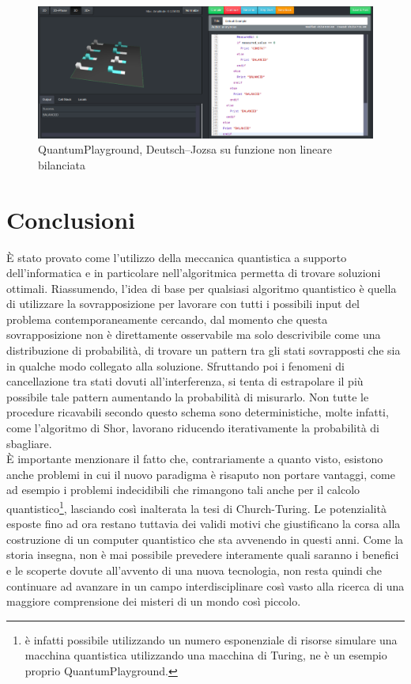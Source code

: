 \documentclass[12pt,a4paper,openright]{report}
\begin{document}
\begin{figure}[h]
    
            \includegraphics[width=.92\textwidth,height=\textheight,keepaspectratio]{nonLinearBalancedFunction}
            \caption{QuantumPlayground, Deutsch–Jozsa su funzione non lineare bilanciata}
        
\end{figure}

\chapter{Conclusioni}
È stato provato come l'utilizzo della meccanica quantistica a supporto dell'informatica e in particolare nell'algoritmica permetta di trovare soluzioni ottimali.
Riassumendo, l'idea di base per qualsiasi algoritmo quantistico è quella di utilizzare la sovrapposizione per lavorare con tutti i possibili input
del problema contemporaneamente cercando, dal momento che questa sovrapposizione non è direttamente osservabile ma solo descrivibile come una distribuzione di 
probabilità, di trovare un pattern tra gli stati sovrapposti che sia in qualche modo collegato alla soluzione. Sfruttando poi i fenomeni di cancellazione tra stati
dovuti all'interferenza, si tenta di estrapolare il più possibile tale pattern aumentando la probabilità di misurarlo. Non tutte le procedure ricavabili secondo
questo schema sono deterministiche, molte infatti, come l'algoritmo di Shor, lavorano riducendo iterativamente la probabilità di sbagliare.\\
È importante menzionare il fatto che, contrariamente a quanto visto, esistono anche problemi in cui il nuovo paradigma è risaputo non portare vantaggi, 
come ad esempio i problemi indecidibili che rimangono tali anche per il calcolo quantistico\footnote{è infatti possibile
utilizzando un numero esponenziale di risorse simulare una macchina quantistica utilizzando una macchina di Turing, ne è un esempio proprio QuantumPlayground.}, lasciando così inalterata la tesi di Church-Turing.
Le potenzialità esposte fino ad ora restano tuttavia dei validi motivi che giustificano la corsa alla costruzione di un computer quantistico
che sta avvenendo in questi anni. Come la storia insegna, non è mai possibile prevedere interamente quali saranno i benefici e le scoperte dovute all'avvento di una nuova tecnologia,
non resta quindi che continuare ad avanzare in un campo interdisciplinare così vasto alla ricerca di una maggiore comprensione dei misteri di un mondo così piccolo.
\end{document}
